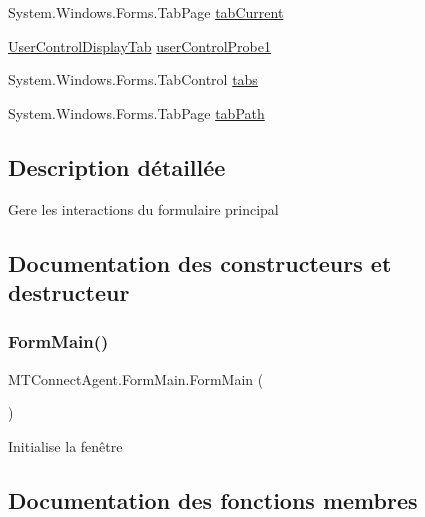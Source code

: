 \begin{DoxyCompactItemize}
\item 
System.\+Windows.\+Forms.\+Tab\+Page \mbox{\hyperlink{class_m_t_connect_agent_1_1_form_main_afb83c919c538512ec8043e3054520672}{tab\+Current}}
\item 
\mbox{\hyperlink{class_m_t_connect_agent_1_1_user_control_display_tab}{User\+Control\+Display\+Tab}} \mbox{\hyperlink{class_m_t_connect_agent_1_1_form_main_adec9b69cbb5d4fa32dac340367ca98fa}{user\+Control\+Probe1}}
\item 
System.\+Windows.\+Forms.\+Tab\+Control \mbox{\hyperlink{class_m_t_connect_agent_1_1_form_main_a21f2a3d788dd4fd47680fdc8b80a516f}{tabs}}
\item 
System.\+Windows.\+Forms.\+Tab\+Page \mbox{\hyperlink{class_m_t_connect_agent_1_1_form_main_a732a9a6fd7aa0f69c764a1c7e75bf1fe}{tab\+Path}}
\end{DoxyCompactItemize}


\subsection{Description détaillée}
Gere les interactions du formulaire principal 



\subsection{Documentation des constructeurs et destructeur}
\mbox{\label{class_m_t_connect_agent_1_1_form_main_a13aab0ed9e05b8165e341ead37cb121e}} 
\subsubsection{\texorpdfstring{Form\+Main()}{FormMain()}}
{\footnotesize\ttfamily M\+T\+Connect\+Agent.\+Form\+Main.\+Form\+Main (\begin{DoxyParamCaption}{ }\end{DoxyParamCaption})\hspace{0.3cm}{\ttfamily [inline]}}



Initialise la fenêtre 



\subsection{Documentation des fonctions membres}
\mbox{\label{class_m_t_connect_agent_1_1_form_main_a52a71c632c1f54d42d45e7220ed97923}} 
